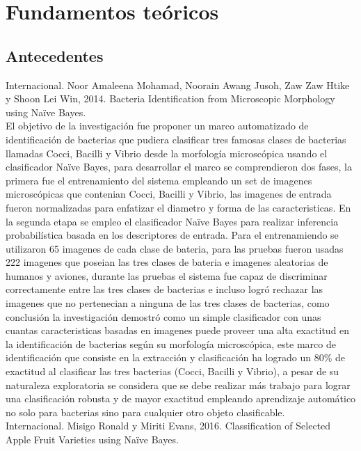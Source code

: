 \chapter{Fundamentos te\'oricos}

\section{Antecedentes}

Internacional. Noor Amaleena Mohamad, Noorain Awang Jusoh, Zaw Zaw Htike y Shoon
Lei Win, 2014. Bacteria Identification from Microscopic Morphology using Naïve Bayes.\\

El objetivo de la investigación fue proponer un marco automatizado de identificación de bacterias que pudiera clasificar tres famosas clases de bacterias llamadas Cocci, Bacilli y Vibrio desde la morfología microscópica usando el clasificador Naïve Bayes, para desarrollar el marco se comprendieron dos fases, la primera fue el entrenamiento del sistema empleando un set de imagenes microscópicas que contenian Cocci, Bacilli y Vibrio, las imagenes de entrada fueron normalizadas para enfatizar el diametro y forma de las caracteristicas. En la segunda etapa se empleo el clasificador Naïve Bayes para realizar inferencia probabilística basada en los descriptores de entrada. Para el entrenamiendo se utilizaron 65 imagenes de cada clase de bateria, para las pruebas fueron usadas 222 imagenes que poseian las tres clases de bateria e imagenes aleatorias de humanos y aviones, durante las pruebas el sistema fue capaz de discriminar correctamente entre las tres clases de bacterias e incluso logró rechazar las imagenes que no pertenecian a ninguna de las tres clases de bacterias, como conclusión la investigación demostró como un simple clasificador con unas cuantas caracteristicas basadas en imagenes puede proveer una alta exactitud en la identificación de bacterias según su morfología microscópica, este marco de identificación que consiste en la extracción y clasificación ha logrado un 80\% de exactitud al clasificar las tres bacterias (Cocci, Bacilli y Vibrio), a pesar de su naturaleza exploratoria se considera que se debe realizar más trabajo para lograr una clasificación robusta y de mayor exactitud empleando aprendizaje automático no solo para bacterias sino para cualquier otro objeto clasificable.\\

Internacional. Misigo Ronald y Miriti Evans, 2016. Classification of Selected Apple Fruit Varieties using Naïve Bayes.\\

